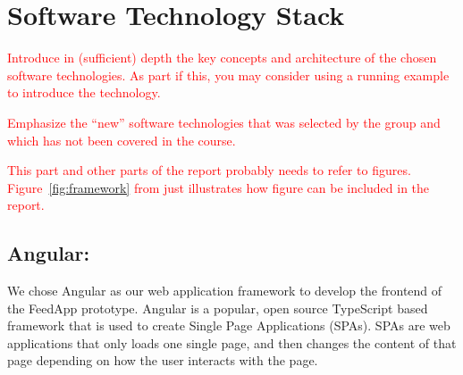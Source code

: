 \section{Software Technology Stack}
\label{sec:technology}

\textcolor{red}{Introduce in (sufficient) depth the key concepts and architecture of the chosen software technologies. As part if this, you may consider using a running example to introduce the technology.}

\textcolor{red}{Emphasize the “new” software technologies that was selected by the group and which has not been covered in the course.}

\textcolor{red}{This part and other parts of the report probably needs to refer to
figures. Figure~\ref{fig:framework} from \cite{brown:96} just
illustrates how figure can be included in the report.}

\subsection{Angular:}
We chose Angular as our web application framework to develop the frontend of the FeedApp
prototype. Angular is a popular, open source TypeScript based framework that is used to create
Single Page Applications (SPAs). SPAs are web applications that only loads one single page, and then
changes the content of that page depending on how the user interacts with the page.

